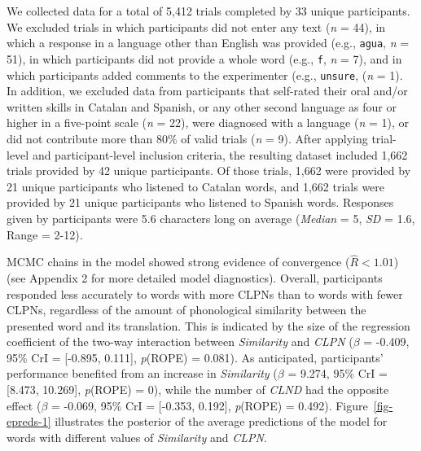 \documentclass[
]{article}
\begin{document}
We collected data for a total of 5,412 trials completed by 33 unique
participants. We excluded trials in which participants did not enter any
text (\emph{n} = 44), in which a response in a language other than
English was provided (e.g., \texttt{agua}, \emph{n} = 51), in which
participants did not provide a whole word (e.g., \texttt{f}, \emph{n} =
7), and in which participants added comments to the experimenter (e.g.,
\texttt{unsure}, (\emph{n} = 1). In addition, we excluded data from
participants that self-rated their oral and/or written skills in Catalan
and Spanish, or any other second language as four or higher in a
five-point scale (\emph{n} = 22), were diagnosed with a language
(\emph{n} = 1), or did not contribute more than 80\% of valid trials
(\emph{n} = 9). After applying trial-level and participant-level
inclusion criteria, the resulting dataset included 1,662 trials provided
by 42 unique participants. Of those trials, 1,662 were provided by 21
unique participants who listened to Catalan words, and 1,662 trials were
provided by 21 unique participants who listened to Spanish words.
Responses given by participants were 5.6 characters long on average
(\emph{Median} = 5, \emph{SD} = 1.6, Range = 2-12).

MCMC chains in the model showed strong evidence of convergence
(\(\hat{R}<1.01\)) (see Appendix 2 for more detailed model diagnostics).
Overall, participants responded less accurately to words with more CLPNs
than to words with fewer CLPNs, regardless of the amount of phonological
similarity between the presented word and its translation. This is
indicated by the size of the regression coefficient of the two-way
interaction between \emph{Similarity} and \emph{CLPN} (\(\beta\) =
-0.409, 95\% CrI = {[}-0.895, 0.111{]}, \emph{p}(ROPE) = 0.081). As
anticipated, participants' performance benefited from an increase in
\emph{Similarity} (\(\beta\) = 9.274, 95\% CrI = {[}8.473, 10.269{]},
\emph{p}(ROPE) = 0), while the number of \emph{CLND} had the opposite
effect (\(\beta\) = -0.069, 95\% CrI = {[}-0.353, 0.192{]},
\emph{p}(ROPE) = 0.492). Figure~\ref{fig-epreds-1} illustrates the
posterior of the average predictions of the model for words with
different values of \emph{Similarity} and \emph{CLPN}.
\end{document}
